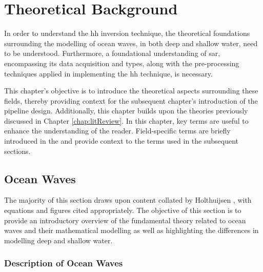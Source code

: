 \chapter{Theoretical Background}
\label{chap:theory}
In order to understand the \ac{hh} inversion technique, the theoretical foundations surrounding the modelling of ocean waves, in both deep and shallow water, need to be understood. Furthermore, a foundational understanding of \ac{sar}, encompassing its data acquisition and types, along with the pre-processing techniques applied in implementing the \ac{hh} technique, is necessary.

This chapter's objective is to introduce the theoretical aspects surrounding these fields, thereby providing context for the subsequent chapter's introduction of the pipeline design. Additionally, this chapter builds upon the theories previously discussed in Chapter \ref{chap:litReview}. In this chapter, key terms are useful to enhance the understanding of the reader. Field-specific terms are briefly introduced in the  and provide context to the terms used in the subsequent sections.

\section{Ocean Waves} \label{sec:theory.waves}
The majority of this section draws upon content collated by Holthuijsen \cite{Holthuijsen2007}, with equations and figures cited appropriately. The objective of this section is to provide an introductory overview of the fundamental theory related to ocean waves and their mathematical modelling as well as highlighting the differences in modelling deep and shallow water. %

\subsection{Description of Ocean Waves} \label{subsec:theory.waves.description}

